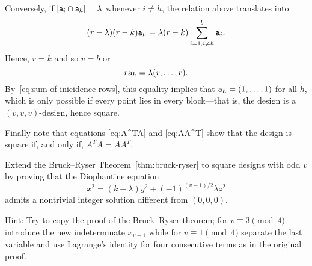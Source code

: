 \begin{solution}
    Conversely, if $|\mathsf a_i\cap\mathsf a_h|=\lambda$ whenever $i\ne h$, the relation above translates into
    $$
        (r-\lambda)(r-k)\mathtt a_h
            = \lambda(r-k)\sum_{i=1,i\ne h}^b\mathtt a_i.
    $$
    Hence, $r=k$ and so $v=b$ or
    $$
        r\mathtt a_h = \lambda(r,\dots,r).
    $$
    By~\eqref{eq:sum-of-inicidence-rows}, this equality implies that\/ $\mathtt a_h = (1,\dots,1)$ for all\/ $h$, which is only possible if every point lies in every block—that is, the design is a\/ $(v,v,v)$-design, hence square.

    Finally note that equations \eqref{eq:A^TA} and \eqref{eq:AA^T} show that the design is square if, and only if, $A^T\!A=AA^T$.
    
\end{solution}

\begin{exr}
    Extend the Bruck--Ryser\/ {\upshape Theorem~\ref{thm:bruck-ryser}} to square designs with odd\/ $v$ by proving that the Diophantine equation
    \[
        x^2 = (k - \lambda)y^2 + (-1)^{(v-1)/2}\lambda z^2
    \]
    admits a nontrivial integer solution different from\/ $(0,0,0)$.
    
    \textrm{\upshape Hint: Try to copy the proof of the Bruck--Ryser theorem; for\/ $v \equiv 3 \pmod{4}$ introduce the new indeterminate\/ $x_{v+1}$ while for\/ $v \equiv 1 \pmod{4}$ separate the last variable and use Lagrange's identity for four consecutive terms as in the original proof.}
\end{exr}

